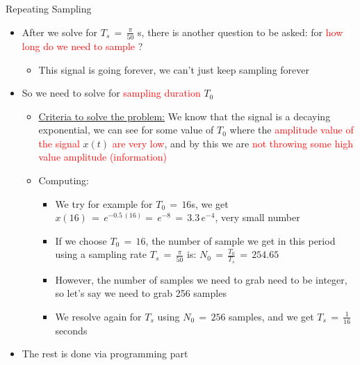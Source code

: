 \begin{frame}[t,allowframebreaks]{Repeating Sampling}

\begin{itemize}

\item After we solve for $T_s \, = \, \displaystyle\frac{\pi}{50}$ s, there is another question to be asked: for \textcolor{red}{how long do we need to sample} ?

	\begin{itemize}
	\item This signal is going forever, we can't just keep sampling forever
	\end{itemize}

\item So we need to solve for \textcolor{red}{sampling duration} $T_0$

	\begin{itemize}
	\item \underline{Criteria to solve the problem:} We know that the signal is a decaying exponential, we can see for some value of $T_0$ where the  \textcolor{red}{amplitude value of the signal} $x(t)$  \textcolor{red}{are very low}, and by this we are  \textcolor{red}{not throwing some high value amplitude (information)}
	
	\item Computing: 
	
	\begin{itemize}
	\item We try for example for $T_0 \, = \, 16$s, we get $x(16) \, = \, e^{-0.5 \, (16)} = \, e^{-8} \, = \, 3.3 \, e^{-4}$, very small number
	
	\item If we choose $T_0 \, = \, 16$, the number of sample we get in this period using a sampling rate $T_s \, = \, \displaystyle\frac{\pi}{50}$ is: $N_0 \, = \, \displaystyle\frac{T_0}{T_s} \, = \, 254.65$
	
	
	\item However, the number of samples we need to grab need to be integer, so let's say we need to grab 256 samples
	
	\item We resolve again for $T_s$ using $N_0 \, = \, 256$ samples, and we get $T_s \, = \, \displaystyle\frac{1}{16}$ seconds 
\end{itemize}		
	
	\end{itemize}

\item The rest is done via programming part


\end{itemize}
\end{frame}

